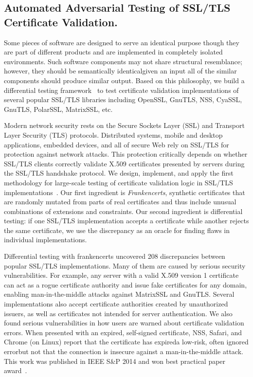 \documentclass[a4paper, 11pt]{article}
\begin{document}
\begin{small}
\subsection*{\small Automated Adversarial Testing of SSL/TLS Certificate Validation.}

Some pieces of software are designed to serve an identical purpose though they are part 
of different products and are implemented in completely isolated environments. Such software 
components may not share structural resemblance; however, they should be semantically 
identical\textemdash given an input all of the similar components should produce similar output. 
Based on this philosophy, we build a differential testing framework~\cite{KeemanDifferentialTesting1998} 
to test certificate validation implementations of several popular SSL/TLS libraries including OpenSSL, 
GnuTLS, NSS, CyaSSL, GnuTLS, PolarSSL, MatrixSSL, etc.

Modern network security rests on the Secure Sockets Layer (SSL) and
Transport Layer Security (TLS) protocols.  Distributed systems, mobile
and desktop applications, embedded devices, and all of secure Web rely
on SSL/TLS for protection against network attacks.  This protection
critically depends on whether SSL/TLS clients correctly validate X.509
certificates presented by servers during the SSL/TLS handshake protocol.
We design, implement, and apply the first methodology for large-scale
testing of certificate validation logic in SSL/TLS implementations~\cite{brubaker2014using}.
Our first ingredient is {\em Frankencerts}, synthetic certificates that are
randomly mutated from parts of real certificates and thus include unusual
combinations of extensions and constraints.  Our second ingredient is
differential testing: if one SSL/TLS implementation accepts a certificate
while another rejects the same certificate, we use the discrepancy as
an oracle for finding flaws in individual implementations.


Differential testing with frankencerts uncovered 208 discrepancies between
popular SSL/TLS implementations. Many of them are caused by serious security
vulnerabilities.  For example, any server with a valid X.509 version
1 certificate can act as a rogue certificate authority and issue fake
certificates for any domain, enabling man-in-the-middle attacks against
MatrixSSL and GnuTLS.  Several implementations also accept certificate
authorities created by unauthorized issuers, as well as certificates
not intended for server authentication. We also found serious vulnerabilities in how users are warned about
certificate validation errors.  When presented with an expired,
self-signed certificate, NSS, Safari, and Chrome (on Linux) report
that the certificate has expired\textemdash a low-risk, often ignored
error\textemdash but not that the connection is insecure against a
man-in-the-middle attack. This work was published in IEEE S\&P 2014 and won best practical paper award~\cite{brubaker2014using}.


\end{small}
\end{document}
